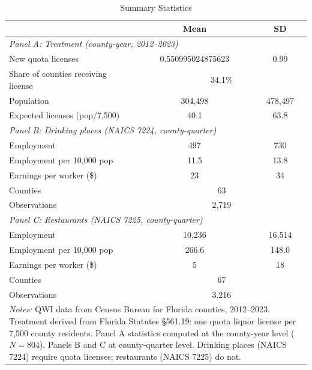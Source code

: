 \begin{table}[htbp]
\centering
\caption{Summary Statistics}
\label{tab:summary}
\begin{tabular}{lcc}
\hline\hline
& Mean & SD \\
\hline
\multicolumn{3}{l}{\textit{Panel A: Treatment (county-year, 2012--2023)}} \\[3pt]
New quota licenses & 0.550995024875623 & 0.99 \\
Share of counties receiving license & \multicolumn{2}{c}{34.1\%} \\
Population & 304,498 & 478,497 \\
Expected licenses (pop/7,500) & 40.1 & 63.8 \\
[6pt]
\multicolumn{3}{l}{\textit{Panel B: Drinking places (NAICS 7224, county-quarter)}} \\[3pt]
Employment & 497 & 730 \\
Employment per 10,000 pop & 11.5 & 13.8 \\
Earnings per worker (\$) & 23 & 34 \\
Counties & \multicolumn{2}{c}{63} \\
Observations & \multicolumn{2}{c}{2,719} \\
[6pt]
\multicolumn{3}{l}{\textit{Panel C: Restaurants (NAICS 7225, county-quarter)}} \\[3pt]
Employment & 10,236 & 16,514 \\
Employment per 10,000 pop & 266.6 & 148.0 \\
Earnings per worker (\$) & 5 & 18 \\
Counties & \multicolumn{2}{c}{67} \\
Observations & \multicolumn{2}{c}{3,216} \\
\hline\hline
\multicolumn{3}{p{0.85\textwidth}}{\footnotesize\textit{Notes:} QWI data from Census Bureau for Florida counties, 2012--2023. Treatment derived from Florida Statutes \S561.19: one quota liquor license per 7,500 county residents. Panel A statistics computed at the county-year level ($N = 804$). Panels B and C at county-quarter level. Drinking places (NAICS 7224) require quota licenses; restaurants (NAICS 7225) do not.}
\end{tabular}
\end{table}
